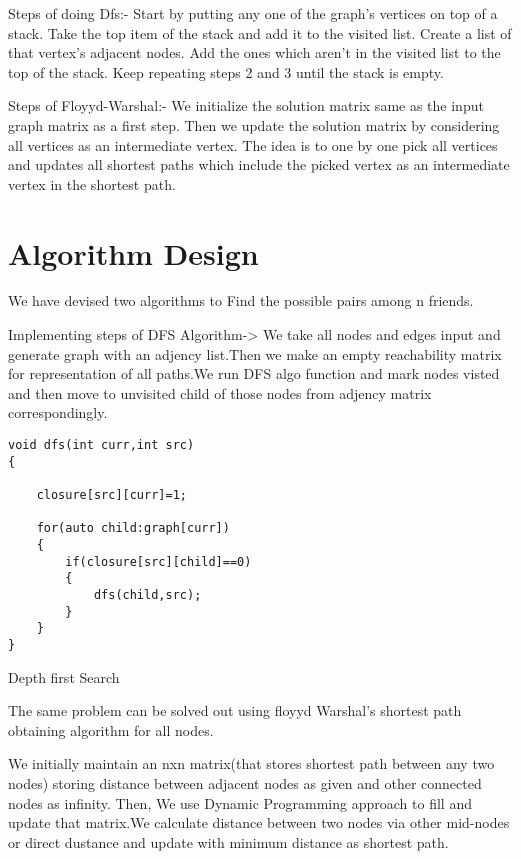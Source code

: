 \documentclass[conference]{IEEEtran}
\begin{document}
Steps of doing Dfs:-
Start by putting any one of the graph's vertices on top of a stack.
Take the top item of the stack and add it to the visited list.
Create a list of that vertex's adjacent nodes. Add the ones which aren't in the visited list to the top of the stack.
Keep repeating steps 2 and 3 until the stack is empty.

Steps of Floyyd-Warshal:-
We initialize the solution matrix same as the input graph matrix as a first step. Then we update the solution matrix by considering all vertices as an intermediate vertex. The idea is to one by one pick all vertices and updates all shortest paths which include the picked vertex as an intermediate vertex in the shortest path.

\section{Algorithm Design}
We have devised two algorithms to Find the possible pairs among n friends.

Implementing steps of DFS Algorithm-> 
We take all nodes and edges input and generate graph with an adjency list.Then we make an empty reachability matrix for representation of all paths.We run DFS algo function and mark nodes visted and then move to unvisited child of those nodes from adjency matrix correspondingly.

\bigskip

\begin{algorithm}[H]
\begin{lstlisting}
void dfs(int curr,int src)
{

    closure[src][curr]=1;

    for(auto child:graph[curr])
    {
        if(closure[src][child]==0)
        {
            dfs(child,src);
        }
    }
}

\end{lstlisting}

 \caption{Depth first Search }
\end{algorithm}

\bigskip
The same problem can be solved out using floyyd Warshal's shortest path obtaining algorithm for all nodes.

\newline We initially maintain an nxn matrix(that stores shortest path between any two nodes)  storing distance between adjacent nodes as given and other connected nodes as infinity.
\newline Then, We use Dynamic Programming approach to fill and update that matrix.We calculate distance between two nodes via other mid-nodes or direct dustance and update with minimum distance as shortest path.
\bigskip
\end{document}
